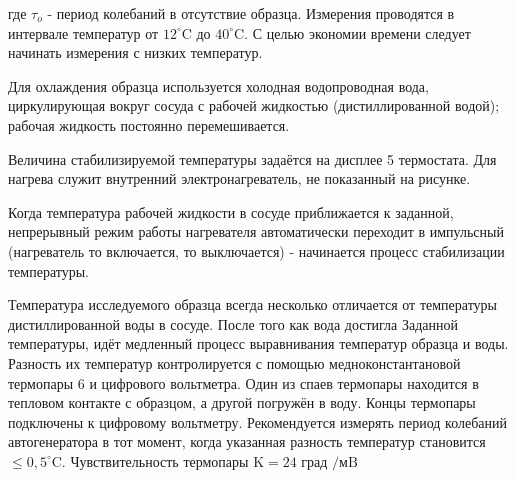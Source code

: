 \documentclass[a4paper, 12pt]{article}%
\begin{document}
	где $\tau_{o}$ - период колебаний в отсутствие образца. Измерения проводятся в интервале температур от $12^{\circ} \mathrm{C}$ до $40^{\circ} \mathrm{C} .$ С целью
	экономии времени следует начинать измерения с низких температур.
	
	Для охлаждения образца используется холодная водопроводная вода, циркулирующая вокруг сосуда с рабочей жидкостью (дистиллированной водой); рабочая жидкость постоянно перемешивается.
	
	Величина стабилизируемой температуры задаётся на дисплее 5 термостата. Для нагрева служит внутренний электронагреватель, не показанный на
	рисунке.
	
	Когда температура рабочей жидкости в сосуде приближается к заданной, непрерывный режим работы нагревателя автоматически переходит в импульсный (нагреватель то включается, то выключается) - начинается процесс стабилизации температуры.
	
	Температура исследуемого образца всегда несколько отличается от температуры дистиллированной воды в сосуде. После того как вода достигла
	Заданной температуры, идёт медленный процесс выравнивания температур
	образца и воды. Разность их температур контролируется с помощью медноконстантановой термопары 6 и цифрового вольтметра. Один из спаев термопары находится в тепловом контакте с образцом, а другой погружён в воду. Концы термопары подключены к цифровому вольтметру. Рекомендуется измерять период колебаний автогенератора в тот момент, когда указанная разность температур становится $\leqslant 0,5^{\circ} \mathrm{C} .$ Чувствительность термопары $\mathrm{K}=24$ град $/ \mathrm{мB}$
\end{document}
